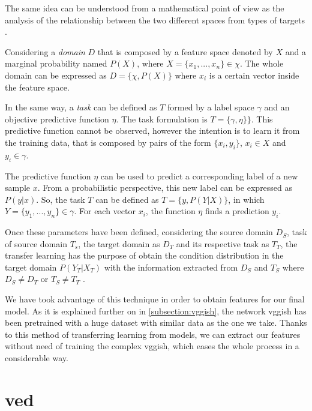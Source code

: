 	The same idea can be understood from a mathematical point of view as the analysis of the relationship between the two different spaces from types of targets \cite{Pan2010}. 
	
	Considering a \textit{domain} $D$ that is composed by a feature space denoted by $X$ and a marginal probability named $P(X)$, where $X = \{x_1,..., x_n\} \in \chi$. The whole domain can be expressed as $D = \{\chi, P(X)\}$  where $x_{i}$  is a certain vector inside the feature space.
	
	In the same way, a \textit{task} can be defined as $T$ formed by a label space $\gamma$ and an objective predictive function $\eta$. The task formulation is $T = \{\gamma, \eta\}\}$. This predictive function cannot be observed, however the intention is to learn it from the training data, that is composed by pairs of the form $\{x_i, y_i\}$, $x_i \in X$ and $y_i \in \gamma$.
	
	The predictive function $\eta$ can be used to predict a corresponding label of a new sample $x$. From a probabilistic perspective, this new label can be expressed as $P(y|x)$. So, the task $T$ can be defined as $T = \{y, P(Y|X)\}$, in which $Y = \{y_1,..., y_n\} \in \gamma$. For each vector $x_i$, the function $\eta$ finds a prediction $y_i$.
	
	Once these parameters have been defined, considering the source domain $D_S$, task of source domain $T_s$, the target domain as $D_T$ and its respective task as $T_T$, the transfer learning has the purpose of obtain the condition distribution in the target domain $P(Y_T|X_T)$ with the information extracted from $D_S$ and $T_S$ where $D_S \neq D_T$ or $T_S \neq T_T$ \cite{Ruder2017}.
	
	We have took advantage of this technique in order to obtain features for our final model. As it is explained further on in \ref{subsection:vggish}, the network \acrshort{vgg}ish has been pretrained with a huge dataset with similar data as the one we take. Thanks to this method of transferring learning from models, we can extract our features without need of training the complex \acrshort{vgg}ish, which eases the whole process in a considerable way.
	
\section{\acrlong{ved}}
\label{section:ved}

